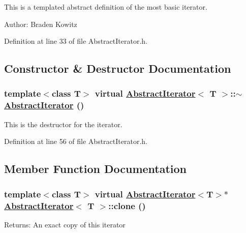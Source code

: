 This is a templated abstract definition of the most basic iterator. \begin{Desc}
\item[Author:]Braden Kowitz \end{Desc}




Definition at line 33 of file Abstract\-Iterator.h.

\subsection{Constructor \& Destructor Documentation}
\hypertarget{classAbstractIterator_a3}{
\subsubsection[$\sim$AbstractIterator]{\setlength{\rightskip}{0pt plus 5cm}template$<$class T$>$ virtual \hyperlink{classAbstractIterator}{Abstract\-Iterator}$<$ T $>$::$\sim$\hyperlink{classAbstractIterator}{Abstract\-Iterator} ()}}
\label{classAbstractIterator_a3}


This is the destructor for the iterator. 

Definition at line 56 of file Abstract\-Iterator.h.

\subsection{Member Function Documentation}
\hypertarget{classAbstractIterator_a0}{
\subsubsection[clone]{\setlength{\rightskip}{0pt plus 5cm}template$<$class T$>$ virtual \hyperlink{classAbstractIterator}{Abstract\-Iterator}$<$T$>$$\ast$ \hyperlink{classAbstractIterator}{Abstract\-Iterator}$<$ T $>$::clone ()}}
\label{classAbstractIterator_a0}


\begin{Desc}
\item[Returns:]An exact copy of this iterator \end{Desc}


